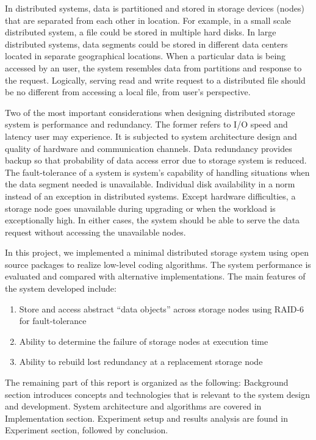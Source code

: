 In distributed systems, data is partitioned and stored in storage devices (nodes) that are separated from each other in location. For example, in a small scale distributed system, a file could be stored in multiple hard disks. In large distributed systems, data segments could be stored in different data centers located in separate geographical locations. When a particular data is being accessed by an user, the system resembles data from partitions and response to the request. Logically, serving read and write request to a distributed file should be no different from accessing a local file, from user's perspective.

Two of the most important considerations when designing distributed storage system is performance and redundancy. The former refers to I/O speed and latency user may experience. It is subjected to system architecture design and quality of hardware and communication channels. Data redundancy provides backup so that probability of data access error due to storage system is reduced. The fault-tolerance of a system is system's capability of handling situations when the data segment needed is unavailable. Individual disk availability in a norm instead of an exception in distributed systems. Except hardware difficulties, a storage node goes unavailable during upgrading or when the workload is exceptionally high. In either cases, the system should be able to serve the data request without accessing the unavailable nodes.

In this project, we implemented a minimal distributed storage system using open source packages to realize low-level coding algorithms. The system performance is evaluated and compared with alternative implementations. The main features of the system developed include: 

\begin{enumerate}
	\item Store and access abstract “data objects” across storage nodes using RAID-6 for fault-tolerance
	
	\item Ability to determine the failure of storage nodes at execution time
	
	\item Ability to rebuild lost redundancy at a replacement storage node
\end{enumerate}


The remaining part of this report is organized as the following: Background section introduces concepts and technologies that is relevant to the system design and development. System architecture and algorithms are covered in Implementation section. Experiment setup and results analysis are found in Experiment section, followed by conclusion.
